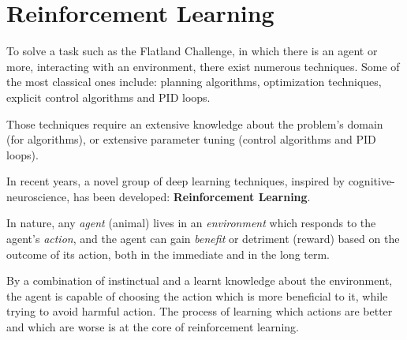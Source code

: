 \documentclass[13pt]{article}
\begin{document}
%
%

\newpage

%
%

\section{Reinforcement Learning}
To solve a task such as the Flatland Challenge, in which there is an agent or more, interacting with an environment, there exist numerous techniques. Some of the most classical ones include: planning algorithms\cite{goosuerw2004models}, optimization techniques\cite{nedic2009distributed}, explicit control algorithms and PID loops\cite{yuan2018uncoupled}.

Those techniques require an extensive knowledge about the problem's domain (for algorithms), or extensive parameter tuning (control algorithms and PID loops).

In recent years, a novel group of deep learning techniques, inspired by cognitive-neuroscience, has been developed: \textbf{Reinforcement Learning}\cite{kaelbling1996reinforcement}.

In nature, any \textit{agent} (animal) lives in an \textit{environment} which responds to the agent's \textit{action}, and the agent can gain \textit{benefit} or detriment (reward) based on the outcome of its action, both in the immediate and in the long term.

By a combination of instinctual and a learnt knowledge about the environment, the agent is capable of choosing the action which is more beneficial to it, while trying to avoid harmful action. The process of learning which actions are better and which are worse is at the core of reinforcement learning.
\end{document}
